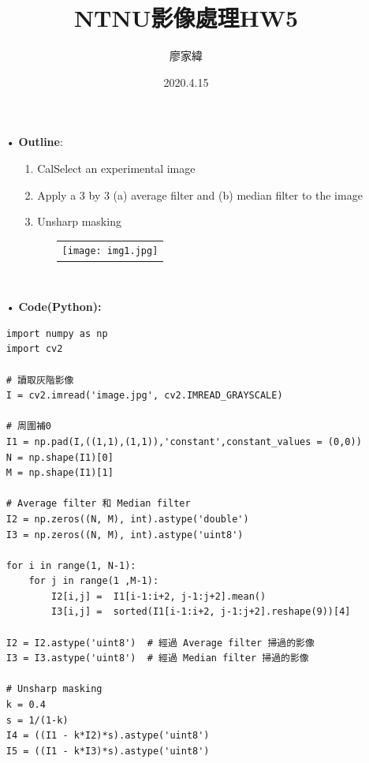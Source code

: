 \documentclass[12pt,a4paper]{article}
\title{NTNU影像處理HW5}
\author{廖家緯}
\date{2020.4.15}
\begin{document}
\maketitle
\fontsize{12pt}{20pt}\selectfont
\setlength{\baselineskip}{20pt}

\pagestyle{fancy}
\lhead{}
\chead{}
\rhead{}
\lfoot{}
\cfoot{\thepage}
\rfoot{}
\renewcommand{\headrulewidth}{0pt} %
\renewcommand{\footrulewidth}{0pt} %




\begin{enumerate}
\item[•]{\bf Outline}:
\begin{enumerate}
\item[1.]CalSelect an experimental image
\item[2.]
Apply a 3 by 3 (a) average filter and
(b) median filter to the image
\item[3.]
Unsharp masking\\
\begin{figure}[h]
\hspace*{5em}
\begin{tabular}{c}
\texttt{[image: img1.jpg]}
\end{tabular}
\end{figure}\\
\end{enumerate}

\item[•]
{\bf Code(Python):}
\begin{lstlisting}
import numpy as np
import cv2

# 讀取灰階影像
I = cv2.imread('image.jpg', cv2.IMREAD_GRAYSCALE)

# 周圍補0
I1 = np.pad(I,((1,1),(1,1)),'constant',constant_values = (0,0))
N = np.shape(I1)[0]
M = np.shape(I1)[1]

# Average filter 和 Median filter
I2 = np.zeros((N, M), int).astype('double')
I3 = np.zeros((N, M), int).astype('uint8')

for i in range(1, N-1):
    for j in range(1 ,M-1):
        I2[i,j] =  I1[i-1:i+2, j-1:j+2].mean()
        I3[i,j] =  sorted(I1[i-1:i+2, j-1:j+2].reshape(9))[4]

I2 = I2.astype('uint8')  # 經過 Average filter 掃過的影像
I3 = I3.astype('uint8')  # 經過 Median filter 掃過的影像

# Unsharp masking
k = 0.4
s = 1/(1-k)
I4 = ((I1 - k*I2)*s).astype('uint8')
I5 = ((I1 - k*I3)*s).astype('uint8')


\end{lstlisting}
\end{enumerate}
\end{document}
